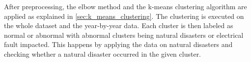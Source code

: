 After preprocessing, the elbow method and the k-means clustering algorithm are applied as explained in \autoref{sec:k_means_clustering}.
The clustering is executed on the whole dataset and the year-by-year data.
Each cluster is then labeled as normal or abnormal with abnormal clusters being natural disasters or electrical fault impacted.
This happens by applying the data on natural disasters and checking whether a natural disaster occurred in the given cluster.






